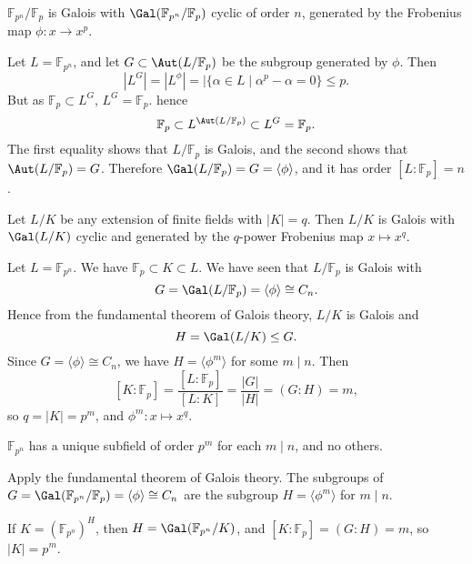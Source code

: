 \documentclass[12pt]{article}
\begin{document}
\begin{theorem}\label{thm:gal_fin_ext}
	$\mathbb{F}_{p^n}/\mathbb{F}_p$ is Galois with $\Gal(\mathbb{F}_{p^n}/\mathbb{F}_p)$ cyclic of order $n$, generated by the Frobenius map $\phi : x \to x^p$.
\end{theorem}

\begin{proofbox}
	Let $L = \mathbb{F}_{p^n}$, and let $G \subset \Aut(L/\mathbb{F}_p)$ be the subgroup generated by $\phi$. Then
	\[
		|L^G| = |L^{\phi}| = |\{\alpha \in L \mid \alpha^p - \alpha = 0\} \leq p.
	\]
	But as $\mathbb{F}_p \subset L^G$, $L^G = \mathbb{F}_p$. hence
	\[
	\mathbb{F}_p \subset L^{\Aut(L/\mathbb{F}_p)} \subset L^G = \mathbb{F}_p.
	\]
	The first equality shows that $L/\mathbb{F}_p$ is Galois, and the second shows that $\Aut(L/\mathbb{F}_p) = G$. Therefore $\Gal(L/\mathbb{F}_p) = G = \langle \phi \rangle$, and it has order $[L: \mathbb{F}_p ] = n$.
\end{proofbox}

\begin{corollary}
	Let $L/K$ be any extension of finite fields with $|K| = q$. Then $L/K$ is Galois with $\Gal(L/K)$ cyclic and generated by the $q$-power Frobenius map $x \mapsto x^q$.
\end{corollary}

\begin{proofbox}
	Let $L = \mathbb{F}_{p^n}$. We have $\mathbb{F}_p \subset K \subset L$. We have seen that $L/\mathbb{F}_p$ is Galois with
	\[
	G = \Gal(L/\mathbb{F}_p) = \langle \phi \rangle \cong C_n.
	\]
	Hence from the fundamental theorem of Galois theory, $L/K$ is Galois and
	\[
	H = \Gal(L/K) \leq G.
	\]
	Since $G = \langle \phi \rangle \cong C_n$, we have $H = \langle \phi^m \rangle$ for some $m \mid n$. Then
	\[
	[K: \mathbb{F}_p] = \frac{[L: \mathbb{F}_p]}{[L:K]} = \frac{|G|}{|H|} = (G:H) = m,
	\]
	so $q = |K| = p^m$, and $\phi^m : x \mapsto x^q$.
\end{proofbox}

\begin{corollary}
	$\mathbb{F}_{p^n}$ has a unique subfield of order $p^m$ for each $m \mid n$, and no others.
\end{corollary}

\begin{proofbox}
	Apply the fundamental theorem of Galois theory. The subgroups of $G = \Gal(\mathbb{F}_{p^n} / \mathbb{F}_p) = \langle \phi \rangle \cong C_n$ are the subgroup $H = \langle \phi^m \rangle$ for $m \mid n$.

	If $K = (\mathbb{F}_{p^n})^H$, then $H = \Gal(\mathbb{F}_{p^n}/K)$, and $[K: \mathbb{F}_p] = (G:H) = m$, so $|K| = p^m$.
\end{proofbox}
\end{document}
